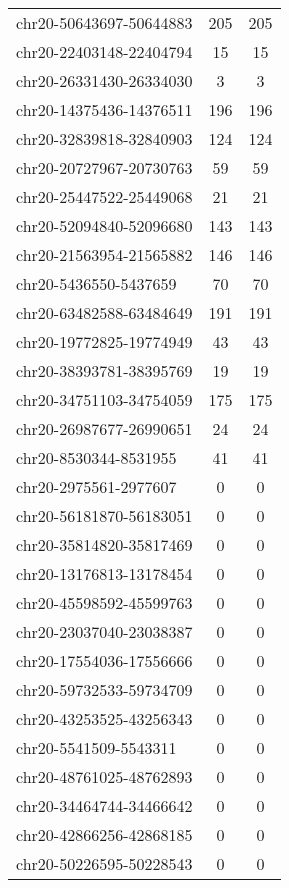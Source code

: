 \documentclass[10pt,letterpaper]{article}
\begin{document}
{\begin{longtable}{lSS}
	chr20-50643697-50644883 & 205    & 205      \\
	chr20-22403148-22404794 & 15     & 15       \\
	chr20-26331430-26334030 & 3      & 3        \\
	chr20-14375436-14376511 & 196    & 196      \\
	chr20-32839818-32840903 & 124    & 124      \\
	chr20-20727967-20730763 & 59     & 59       \\
	chr20-25447522-25449068 & 21     & 21       \\
	chr20-52094840-52096680 & 143    & 143      \\
	chr20-21563954-21565882 & 146    & 146      \\
	chr20-5436550-5437659   & 70     & 70       \\
	chr20-63482588-63484649 & 191    & 191      \\
	chr20-19772825-19774949 & 43     & 43       \\
	chr20-38393781-38395769 & 19     & 19       \\
	chr20-34751103-34754059 & 175    & 175      \\
	chr20-26987677-26990651 & 24     & 24       \\
	chr20-8530344-8531955   & 41     & 41       \\
	chr20-2975561-2977607   & 0      & 0        \\
	chr20-56181870-56183051 & 0      & 0        \\
	chr20-35814820-35817469 & 0      & 0        \\
	chr20-13176813-13178454 & 0      & 0        \\
	chr20-45598592-45599763 & 0      & 0        \\
	chr20-23037040-23038387 & 0      & 0        \\
	chr20-17554036-17556666 & 0      & 0        \\
	chr20-59732533-59734709 & 0      & 0        \\
	chr20-43253525-43256343 & 0      & 0        \\
	chr20-5541509-5543311   & 0      & 0        \\
	chr20-48761025-48762893 & 0      & 0        \\
	chr20-34464744-34466642 & 0      & 0        \\
	chr20-42866256-42868185 & 0      & 0        \\
	chr20-50226595-50228543 & 0      & 0        \\

\end{longtable}}
\end{document}
